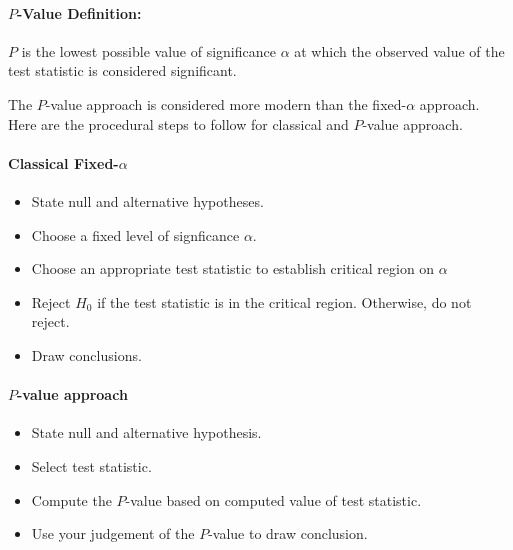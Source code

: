 \documentclass[a4paper,12pt]{report}
\begin{document}
\paragraph{$P$-Value Definition: } $P$ is the lowest possible value of significance $\alpha$ at which the observed value of the test statistic is considered significant.

The $P$-value approach is considered more modern than the fixed-$\alpha$ approach. Here are the procedural steps to follow for classical and $P$-value approach.

\paragraph{Classical Fixed-$\alpha$} 

\begin{itemize}
\item State null and alternative hypotheses.
\item Choose a fixed level of signficance $\alpha$.
\item Choose an appropriate test statistic to establish critical region on $\alpha$
\item Reject $H_0$ if the test statistic is in the critical region. Otherwise, do not reject.
\item Draw conclusions.
\end{itemize}

\paragraph{$P$-value approach} 

\begin{itemize}
\item State null and alternative hypothesis.
\item Select test statistic.
\item Compute the $P$-value based on computed value of test statistic.
\item Use your judgement of the $P$-value to draw conclusion.
\end{itemize}
\end{document}
